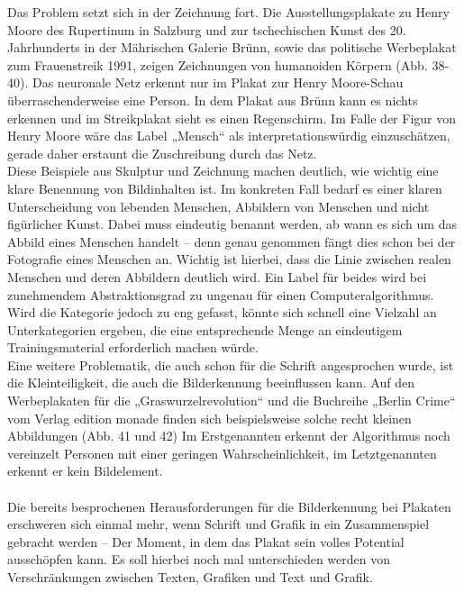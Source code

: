 \documentclass[a4paper,12pt,ngerman]{article}
\begin{document}
Das Problem setzt sich in der Zeichnung fort. Die Ausstellungsplakate zu Henry Moore des Rupertinum in Salzburg und zur tschechischen Kunst des 20. Jahrhunderts in der Mährischen Galerie Brünn, sowie das politische Werbeplakat zum Frauenstreik 1991, zeigen Zeichnungen von humanoiden Körpern (Abb. 38-40). Das neuronale Netz erkennt nur im Plakat zur Henry Moore-Schau überraschenderweise eine Person. In dem Plakat aus Brünn kann es nichts erkennen und im Streikplakat sieht es einen Regenschirm. Im Falle der Figur von Henry Moore wäre das Label „Mensch“ als interpretationswürdig einzuschätzen, gerade daher erstaunt die Zuschreibung durch das Netz. \\
Diese Beispiele aus Skulptur und Zeichnung machen deutlich, wie wichtig eine klare Benennung von Bildinhalten ist. Im konkreten Fall bedarf es einer klaren Unterscheidung von lebenden Menschen, Abbildern von Menschen und nicht figürlicher Kunst. Dabei muss eindeutig benannt werden, ab wann es sich um das Abbild eines Menschen handelt -- denn genau genommen fängt dies schon bei der Fotografie eines Menschen an. Wichtig ist hierbei, dass die Linie zwischen realen Menschen und deren Abbildern deutlich wird. Ein Label für beides wird bei zunehmendem Abstraktionsgrad zu ungenau für einen Computeralgorithmus. Wird die Kategorie jedoch zu eng gefasst, könnte sich schnell eine Vielzahl an Unterkategorien ergeben, die eine entsprechende Menge an eindeutigem Trainingsmaterial erforderlich machen würde. \\
Eine weitere Problematik, die auch schon für die Schrift angesprochen wurde, ist die Kleinteiligkeit, die auch die Bilderkennung beeinflussen kann. Auf den Werbeplakaten für die „Graswurzelrevolution“ und die Buchreihe „Berlin Crime“ vom Verlag edition monade finden sich beispielsweise solche recht kleinen Abbildungen (Abb. 41 und 42) Im Erstgenannten erkennt der Algorithmus noch vereinzelt Personen mit einer geringen Wahrscheinlichkeit, im Letztgenannten erkennt er kein Bildelement. \\
\\
Die bereits besprochenen Herausforderungen für die Bilderkennung bei Plakaten erschweren sich einmal mehr, wenn Schrift und Grafik in ein Zusammenspiel gebracht werden -- Der Moment, in dem das Plakat sein volles Potential ausschöpfen kann. Es soll hierbei noch mal unterschieden werden von Verschränkungen zwischen Texten, Grafiken und Text und Grafik. \\
\end{document}
